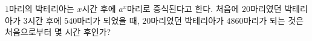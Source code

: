 $1$마리의 박테리아는 $x$시간 후에 $a^{x}$마리로 증식된다고 한다. 처음에 $20$마리였던 박테리아가 $3$시간 후에 $540$마리가 되었을 때, $20$마리였던 박테리아가 $4860$마리가 되는 것은 처음으로부터 몇 시간 후인가? 
